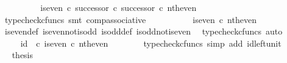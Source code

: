 \begin{isabellebody}
\ \ \ \ \isamarkupfalse%
\ \isamarkupfalse%
\ {\isachardoublequoteopen}{\isachardot}{\kern0pt}{\isachardot}{\kern0pt}{\isachardot}{\kern0pt}\ {\isacharequal}{\kern0pt}\ {\isacharparenleft}{\kern0pt}{\isacharparenleft}{\kern0pt}is{\isacharunderscore}{\kern0pt}even\ {\isasymcirc}\isactrlsub c\ successor{\isacharparenright}{\kern0pt}\ {\isasymcirc}\isactrlsub c\ successor{\isacharparenright}{\kern0pt}\ {\isasymcirc}\isactrlsub c\ nth{\isacharunderscore}{\kern0pt}even{\isachardoublequoteclose}\isanewline
\ \ \ \ \ \ \isamarkupfalse%
\ {\isacharparenleft}{\kern0pt}typecheck{\isacharunderscore}{\kern0pt}cfuncs{\isacharcomma}{\kern0pt}\ smt\ comp{\isacharunderscore}{\kern0pt}associative{}{\isacharparenright}{\kern0pt}\isanewline
\ \ \ \ \isamarkupfalse%
\ \isamarkupfalse%
\ {\isachardoublequoteopen}{\isachardot}{\kern0pt}{\isachardot}{\kern0pt}{\isachardot}{\kern0pt}\ {\isacharequal}{\kern0pt}\ \ is{\isacharunderscore}{\kern0pt}even\ {\isasymcirc}\isactrlsub c\ nth{\isacharunderscore}{\kern0pt}even{\isachardoublequoteclose}\isanewline
\ \ \ \ \ \ \isamarkupfalse%
\ is{\isacharunderscore}{\kern0pt}even{\isacharunderscore}{\kern0pt}def{}\ is{\isacharunderscore}{\kern0pt}even{\isacharunderscore}{\kern0pt}not{\isacharunderscore}{\kern0pt}is{\isacharunderscore}{\kern0pt}odd\ is{\isacharunderscore}{\kern0pt}odd{\isacharunderscore}{\kern0pt}def{}\ is{\isacharunderscore}{\kern0pt}odd{\isacharunderscore}{\kern0pt}not{\isacharunderscore}{\kern0pt}is{\isacharunderscore}{\kern0pt}even\ \isamarkupfalse%
\ {\isacharparenleft}{\kern0pt}typecheck{\isacharunderscore}{\kern0pt}cfuncs{\isacharcomma}{\kern0pt}\ auto{\isacharparenright}{\kern0pt}\isanewline
\ \ \ \ \isamarkupfalse%
\ \isamarkupfalse%
\ {\isachardoublequoteopen}{\isachardot}{\kern0pt}{\isachardot}{\kern0pt}{\isachardot}{\kern0pt}\ {\isacharequal}{\kern0pt}\ id\ {\isasymOmega}\ {\isasymcirc}\isactrlsub c\ is{\isacharunderscore}{\kern0pt}even\ {\isasymcirc}\isactrlsub c\ nth{\isacharunderscore}{\kern0pt}even{\isachardoublequoteclose}\isanewline
\ \ \ \ \ \ \isamarkupfalse%
\ {\isacharparenleft}{\kern0pt}typecheck{\isacharunderscore}{\kern0pt}cfuncs{\isacharcomma}{\kern0pt}\ simp\ add{\isacharcolon}{\kern0pt}\ id{\isacharunderscore}{\kern0pt}left{\isacharunderscore}{\kern0pt}unit{}{\isacharparenright}{\kern0pt}\isanewline
\ \ \ \ \isamarkupfalse%
\ \isamarkupfalse%
\ {\isacharquery}{\kern0pt}thesis\isanewline

\end{isabellebody}
